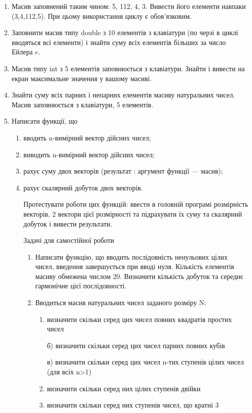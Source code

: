 \documentclass[]{article}
\makeatletter
\newcommand{\xslalph}[1]{\expandafter\@xslalph\csname c@#1\endcsname}
\newcommand{\@xslalph}[1]{%
    \ifcase#1\or а\or б\or в\or г\or д\or e\or є\or ж\or з\or i%
    \or й\or к\or л\or м\or н\or о\or п\or р\or с\or т%
    \or у\or ф\or х\or ц\or ч\or ш\or ю\or я\or аа\or бб\or вв%
    \else\@ctrerr\fi%
}
\makeatother
\begin{document}
\begin{enumerate}
\def\labelenumi{\arabic{enumi})}
\item
  Масив заповнений таким чином: 5, 112, 4, 3. Вивести його елементи
  навпаки (3,4,112,5). При цьому використання циклу є обов'язковим.
\item
  Заповнити масив типу double з 10 елементів з клавіатури (по черзі в
  циклі вводяться всі елементи) і знайти суму всіх елементів більших за
  число Ейлера \(e\).
\item
  Масив типу int з 5 елементів заповнюється з клавіатури. Знайти і
  вивести на екран максимальне значення у вашому масиві.
\item
  Знайти суму всіх парних і непарних елементів масиву натуральних чисел.
  Масив заповнюється з клавіатури, 5 елементів.
\item
  \protect\hypertarget{_Hlk65236602}{}{}Написати функції, що
\begin{enumerate}[label=\xslalph*)]
\item вводить n-вимірний вектор дійсних чисел;
\item виводить n-вимірний вектор дійсних чисел;
\item рахує суму двох векторів (результат : аргумент функції --- масив);
\item рахує скалярний добуток двох векторів.

Протестувати роботи цих функцій: ввести в головній програмі розмірність
векторів, 2 вектори цієї розмірності та підрахувати їх суму та скалярний
добуток і вивести результати.

Задачі для самостійної роботи

\begin{enumerate}
\def\labelenumi{\arabic{enumi})}
\item
  Написати функцію, що вводить послідовність ненульових цілих чисел,
  введення завершується при вводі нуля. Кількість елементів масиву
  обмежена числом 20. Визначити кількість добуток та середнє гармонічне
  цієї послідовності.
\item
  Вводиться масив натуральних чисел заданого розміру N:
\begin{enumerate}[label=\xslalph*)]
\item визначити скільки серед цих чисел повних квадратів простих чисел

б) визначити скільки серед цих чисел парних повних кубів

в) визначити скільки серед цих чисел n-тих ступенів цілих чисел (для
всіх n\textgreater{}1)
\item визначити скільки серед них цілих ступенів двійки
\item визначити скільки серед них ступенів чисел, що кратні 3


\end{enumerate}
\end{enumerate}
\end{enumerate}
\end{enumerate}
\end{document}

